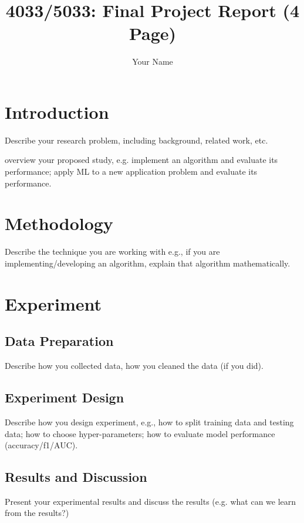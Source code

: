 \documentclass{article}
\title{4033/5033: Final Project Report (4 Page)}
\author{Your Name}
\date{}
\begin{document}
\maketitle

\section{Introduction}

Describe your research problem, 
including background, related work, etc. 

overview your proposed study, e.g. 
implement an algorithm and evaluate 
its performance; apply ML to a new 
application problem and evaluate its 
performance. 


\section{Methodology}

Describe the technique you are working 
with e.g., if you are implementing/developing 
an algorithm, explain that algorithm 
mathematically. 

\section{Experiment}

\subsection{Data Preparation}

Describe how you collected data, how 
you cleaned the data (if you did). 

\subsection{Experiment Design}

Describe how you design experiment, 
e.g., how to split training data and testing 
data; how to choose hyper-parameters; how 
to evaluate model performance (accuracy/f1/AUC).

\subsection{Results and Discussion}

Present your experimental results and discuss 
the results (e.g. what can we learn from the 
results?)


\end{document}
